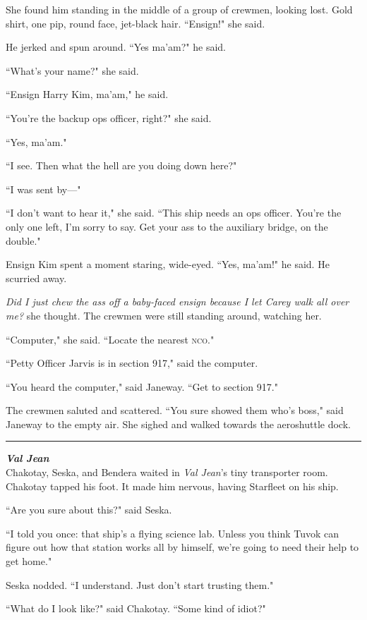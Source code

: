 \documentclass[twoside,letterpaper,12pt]{memoir}
\begin{document}
She found him standing in the middle of a group of crewmen, looking lost. Gold shirt, one pip, round face, jet-black hair. ``Ensign!" she said.

He jerked and spun around. ``Yes ma'am?" he said.

``What's your name?" she said.

``Ensign Harry Kim, ma'am," he said.

``You're the backup ops officer, right?" she said.

``Yes, ma'am."

``I see. Then what the hell are you doing down here?"

``I was sent by---"

``I don't want to hear it," she said. ``This ship needs an ops officer. You're the only one left, I'm sorry to say. Get your ass to the auxiliary bridge, on the double."

Ensign Kim spent a moment staring, wide-eyed. ``Yes, ma'am!" he said. He scurried away.

\textit{Did I just chew the ass off a baby-faced ensign because I let Carey walk all over me?} she thought. The crewmen were still standing around, watching her.

``Computer," she said. ``Locate the nearest \textsc{nco}."

``Petty Officer Jarvis is in section 917," said the computer.

``You heard the computer," said Janeway. ``Get to section 917."

The crewmen saluted and scattered. ``You sure showed them who's boss," said Janeway to the empty air. She sighed and walked towards the aeroshuttle dock.

\fancybreak{\rule{3cm}{0.4 pt}}
\noindent\textit{\textbf{Val Jean}}\\

Chakotay, Seska, and Bendera waited in \textit{Val Jean}'s tiny transporter room. Chakotay tapped his foot. It made him nervous, having Starfleet on his ship.

``Are you sure about this?" said Seska.

``I told you once: that ship's a flying science lab. Unless you think Tuvok can figure out how that station works all by himself, we're going to need their help to get home."

Seska nodded. ``I understand. Just don't start trusting them."

``What do I look like?" said Chakotay. ``Some kind of idiot?"
\end{document}
